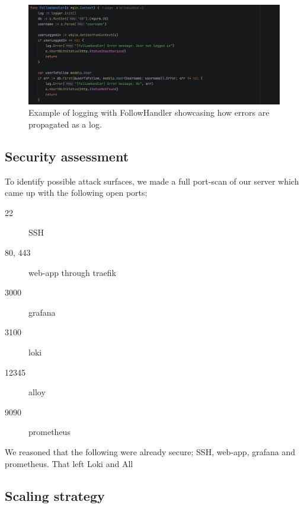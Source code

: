 \begin{figure} [H]
    \centering
    \includegraphics[width=1\linewidth]{pictures/StdLog.png}
    \caption{Example of logging with FollowHandler showcasing how errors are propagated as a log.}
    \label{fig:enter-label}
\end{figure}


\subsection{Security assessment} %
To identify possible attack surfaces, we made a full port-scan of our server which came up with the following open ports;
\begin{description}
    \item[22] SSH
    \item[80, 443] web-app through traefik
    \item[3000] grafana
    \item[3100] loki
    \item[12345] alloy
    \item[9090] prometheus
\end{description}
We reasoned that the following were already secure; SSH, web-app, grafana and prometheus. That left Loki and All
\subsection{Scaling strategy} %


